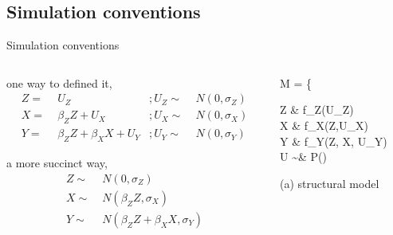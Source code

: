 \subsection{Simulation conventions}
%
%
\begin{frame}[t, negative]
	\subsectionpage
\end{frame}
%
%
\begin{frame}
	{Simulation conventions}
	\begin{columns}
		\begin{column}{0.5\textwidth}
			one way to defined it,
			\begin{align*}
				Z = & \; U_{Z} &; U_{Z} \sim & \; N(0, \sigma_{Z})\\
				X = & \; \beta_{Z} Z + U_{X} &; U_{X} \sim & \; N(0, \sigma_{X}) \\
				Y = & \; \beta_{Z} Z + \beta_{X} X + U_{Y} &; U_{Y} \sim & \; N(0, \sigma_{Y})
			\end{align*}
			
			a more succinct way,
			\begin{align*}
				Z \sim & \; N(0, \sigma_{Z}) \\
				X \sim & \; N(\beta_{Z} Z, \sigma_{X}) \\
				Y \sim & \; N(\beta_{Z} Z + \beta_{X} X, \sigma_{Y}) 
			\end{align*}
		\end{column}
		\begin{column}{0.5\textwidth}  
			\begin{equ}
				M = \left\{ \begin{aligned} 
					Z \leftarrow & \; f_{Z}(U_{Z}) \\
					X \leftarrow & \; f_{X}(Z,U_{X}) \\
					Y \leftarrow & \; f_{Y}(Z, X, U_{Y}) \\
					U \sim & \; P()
				\end{aligned} \right
				\caption*{(a) structural model}
			\end{equ}
			\begin{figure}
\end{figure}
\end{column}
\end{columns}
\end{frame}
